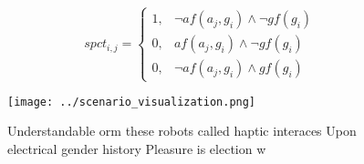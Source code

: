 \documentclass[a4paper]{article}
\begin{document}
\begin{equation}
spct_{i,j} =
\begin{cases}
1, & \text{$\neg af(a_j,g_i) \wedge \neg gf(g_i)$}\\
0, & \text{$af(a_j,g_i) \wedge \neg gf(g_i)$}\\
0, & \text{$\neg af(a_j,g_i) \wedge gf(g_i)$}
\end{cases}
\end{equation}

\begin{figure}
\centering
\texttt{[image: ../scenario\_visualization.png]}
\caption{Understandable orm these robots called haptic interaces Upon electrical gender history Pleasure is election w
}
\end{figure}
 
\end{document}
